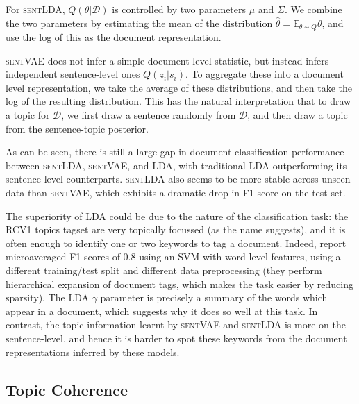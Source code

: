 For \textsc{sentLDA}, $Q(\theta | \mathcal{D})$ is controlled by two parameters $\mu$ and $\Sigma$. We combine the two parameters by estimating the mean of the distribution $\hat{\theta} = \mathbb{E}_{\theta \sim Q} \theta$, and use the log of this as the document representation.

\textsc{sentVAE} does not infer a simple document-level statistic, but instead infers independent sentence-level ones $Q(z_i | s_i)$. To aggregate these into a document level representation, we take the average of these distributions, and then take the log of the resulting distribution. This has the natural interpretation that to draw a topic for $\mathcal{D}$, we first draw a sentence randomly from $\mathcal{D}$, and then draw a topic from the sentence-topic posterior.

As can be seen, there is still a large gap in document classification performance between \textsc{sentLDA}, \textsc{sentVAE}, and LDA, with traditional LDA outperforming its sentence-level counterparts. \textsc{sentLDA} also seems to be more stable across unseen data than \textsc{sentVAE}, which exhibits a dramatic drop in F1 score on the test set.

The superiority of LDA could be due to the nature of the classification task: the RCV1 topics tagset are very topically focussed (as the name suggests), and it is often enough to identify one or two keywords to tag a document. Indeed, \citet{Lewis:04} report microaveraged F1 scores of 0.8 using an SVM with word-level features, using a different training/test split and different data preprocessing (they perform hierarchical expansion of document tags, which makes the task easier by reducing sparsity). The LDA $\gamma$ parameter is precisely a summary of the words which appear in a document, which suggests why it does so well at this task. In contrast, the topic information learnt by \textsc{sentVAE} and \textsc{sentLDA} is more on the sentence-level, and hence it is harder to spot these keywords from the document representations inferred by these models.

\subsection{Topic Coherence}

